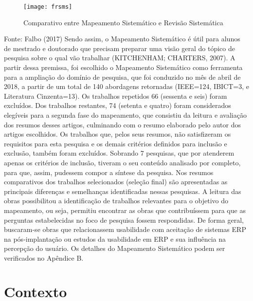 \begin{figure}[H]
	\centering	
	\caption{Comparativo entre Mapeamento Sistemático e Revisão Sistemática}
	\texttt{[image: frsms]}
	\label{fig:figura-revisao-x-mapeamento}
\end{figure}
\vspace{-0.8 cm} \hspace{-0.5 cm} Fonte: Falbo (2017)\newline
\indent Sendo assim, o Mapeamento Sistemático é útil para alunos de mestrado e doutorado que precisam preparar uma visão geral do tópico de pesquisa sobre o qual vão trabalhar (KITCHENHAM; CHARTERS, 2007).\newline
\indent A partir dessa premissa, foi escolhido o Mapeamento Sistemático como ferramenta para a ampliação do domínio de pesquisa, que foi conduzido no mês de abril de 2018, a partir de um total de 140 abordagens retornadas (IEEE=124, IBICT=3, e Literatura Cinzenta=13). Os trabalhos repetidos 66 (sessenta e seis) foram excluídos. Dos trabalhos restantes, 74 (setenta e quatro) foram considerados elegíveis para a segunda fase do mapeamento, que consistiu da leitura e avaliação dos resumos desses artigos, culminando com o resumo elaborado pelo autor dos artigos escolhidos.\newline
\indent Os trabalhos que, pelos seus resumos, não satisfizeram os requisitos para esta pesquisa e os demais critérios definidos para inclusão e exclusão, também foram excluídos. Sobrando 7 pesquisas, que por atenderem apenas os critérios de inclusão, tiveram o seu conteúdo analisado por completo, para que, assim, pudessem compor a síntese da pesquisa.\newline
\indent Nos resumos comparativos dos trabalhos selecionados (seleção final) são apresentadas as principais diferenças e semelhanças identificadas nessas pesquisas.\newline
\indent A leitura das obras possibilitou a identificação de trabalhos relevantes para o objetivo do mapeamento, ou seja, permitiu encontrar as obras que contribuíssem para que as perguntas estabelecidas no foco de pesquisa fossem respondidas.\newline
\indent De forma geral, buscaram-se obras que relacionassem usabilidade com aceitação de sistemas ERP na pós-implantação ou estudos da usabilidade em ERP e sua influência na percepção do usuário. Os detalhes do Mapeamento Sistemático podem ser verificados no Apêndice B.

\section{Contexto}  \label{Contexto}


